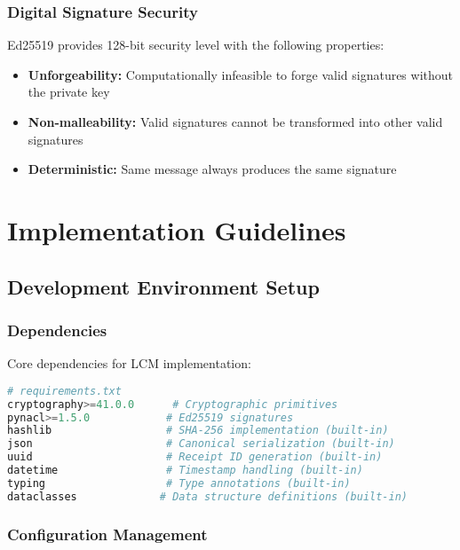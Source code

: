 \documentclass[12pt,a4paper]{article}
\begin{document}
\subsubsection{Digital Signature Security}

Ed25519 provides 128-bit security level with the following properties:

\begin{itemize}
\item \textbf{Unforgeability:} Computationally infeasible to forge valid signatures without the private key
\item \textbf{Non-malleability:} Valid signatures cannot be transformed into other valid signatures
\item \textbf{Deterministic:} Same message always produces the same signature
\end{itemize}

\section{Implementation Guidelines}

\subsection{Development Environment Setup}

\subsubsection{Dependencies}

Core dependencies for LCM implementation:

\begin{lstlisting}[language=Python, caption=Python Dependencies]
# requirements.txt
cryptography>=41.0.0      # Cryptographic primitives
pynacl>=1.5.0            # Ed25519 signatures
hashlib                  # SHA-256 implementation (built-in)
json                     # Canonical serialization (built-in)
uuid                     # Receipt ID generation (built-in)
datetime                 # Timestamp handling (built-in)
typing                   # Type annotations (built-in)
dataclasses             # Data structure definitions (built-in)
\end{lstlisting}

\subsubsection{Configuration Management}
\end{document}
